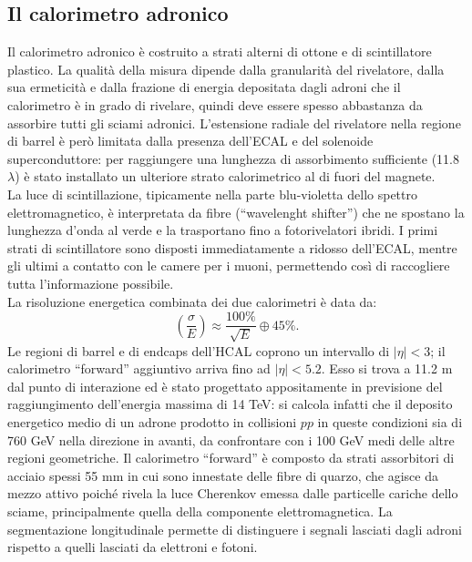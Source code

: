 \subsection{Il calorimetro adronico}
Il calorimetro adronico \`e costruito a strati alterni di ottone e di scintillatore plastico. La qualit\`a della misura dipende dalla granularit\`a del rivelatore, dalla sua ermeticit\`a e dalla frazione di energia depositata dagli adroni che il calorimetro \`e in grado di rivelare, quindi deve essere spesso abbastanza da assorbire tutti gli sciami adronici. L'estensione radiale del rivelatore nella regione di barrel \`e per\`o limitata dalla presenza dell'ECAL e del solenoide superconduttore: per raggiungere una lunghezza di assorbimento sufficiente (11.8$\lambda$) \`e stato installato un ulteriore strato calorimetrico al di fuori del magnete.\\
La luce di scintillazione, tipicamente nella parte blu-violetta dello spettro elettromagnetico, \`e interpretata da fibre (``wavelenght shifter'') che ne spostano la lunghezza d'onda al verde e la trasportano fino a fotorivelatori ibridi. I primi strati di scintillatore sono disposti immediatamente a ridosso dell'ECAL, mentre gli ultimi a contatto con le camere per i muoni, permettendo cos\`i di raccogliere tutta l'informazione possibile.\\
La risoluzione energetica combinata dei due calorimetri \`e data da:
\begin{equation}
\left( \frac{\sigma}{E} \right) \approx \frac{100\%}{\sqrt{E}} \oplus 45\%.
\end{equation}
Le regioni di barrel e di endcaps dell'HCAL coprono un intervallo di $|\eta|<3$; il calorimetro ``forward'' aggiuntivo arriva fino ad $|\eta|<5.2$. Esso si trova a 11.2 m dal punto di interazione ed \`e stato progettato appositamente in previsione del raggiungimento dell'energia massima di 14 TeV: si calcola infatti che il deposito energetico medio di un adrone prodotto in collisioni $pp$ in queste condizioni sia di 760 GeV nella direzione in avanti, da confrontare con i 100 GeV medi delle altre regioni geometriche. Il calorimetro ``forward'' \`e composto da strati assorbitori di acciaio spessi 55 mm in cui sono innestate delle fibre di quarzo, che agisce da mezzo attivo poich\'e rivela la luce Cherenkov emessa dalle particelle cariche dello sciame, principalmente quella della componente elettromagnetica. La segmentazione longitudinale permette di distinguere i segnali lasciati dagli adroni rispetto a quelli lasciati da elettroni e fotoni.

